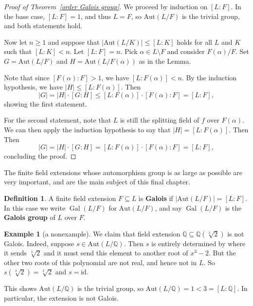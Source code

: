 \documentclass[12pt]{report}
\numberwithin{equation}{section}
\numberwithin{theorem}{chapter}
\theoremstyle{definition}
\newtheorem{definition}[theorem]{Definition}
\newtheorem{example}[theorem]{Example}
\newtheorem*{basic properties}{Basic Properties}
\newtheorem*{Important Remark}{Important Remark}
\newcommand{\df}[1]{{\bf #1}\index{#1}}
\DeclareMathOperator{\Gal}{Gal}
\begin{document}
\begin{proof}[Proof of Theorem~\ref{order Galois group}]
We proceed by induction on $[L : F]$. In the base case, $[L:F]=1$, and thus $L = F$, so $\mathrm{Aut}(L/F)$ is the trivial group, and both statements hold.

Now let $n \geqslant 1$ and suppose that $|\mathrm{Aut}(L/K)| \leqslant [L : K]$ holds for all $L$ and $K$ such that $[L : K] < n$. Let $[L : F] = n$. Pick $\alpha \in L \setminus F$ and consider $F(\alpha)/F$. Set $G=\mathrm{Aut}(L/F)$ and $H=\mathrm{Aut}(L/F(\alpha))$ as in the Lemma.


Note that since $[F(\alpha):F]>1$, we have $[L:F(\alpha)]<n$. 
By the induction hypothesis, we have $|H| \leqslant [L: F(\alpha)]$. Then 
\[ |G| = |H| \cdot [G:H] \leq [L:F(\alpha)] \cdot [F(\alpha) : F] =[L:F],\]
showing the first statement.

For the second statement, note that $L$ is still the splitting field of $f$ over $F(\alpha)$. We can then apply the induction hypothesis to say that $|H|=[L:F(\alpha)]$. Then 
Then 
\[ |G| = |H| \cdot [G:H] = [L:F(\alpha)] \cdot [F(\alpha) : F] =[L:F],\]
concluding the proof.
\end{proof}




The finite field extensions whose automorphism group is as large as possible are very important, and are the main subject of this final chapter.
 

\begin{definition}\index{$\Gal(L/F)$}
A {finite} field extension $F \subseteq L$ is {\bf Galois} if $|\mathrm{Aut}(L/F) |= [L:F]$. In this case we write $\Gal(L/F)$ for $\mathrm{Aut}(L/F)$, and say $\Gal(L/F)$ is the \df{Galois group} of $L$ over $F$.
\end{definition}



\begin{example}[a nonexample]\label{non Galois example}
We claim that field extension $\mathbb{Q} \subseteq \mathbb{Q}(\sqrt[3]{2})$ is not Galois. Indeed, suppose $s \in \mathrm{Aut}(L/\mathbb{Q})$. Then $s$ is entirely determined by where it sends $\sqrt[3]{2}$ and it must send this element to another root of $x^3 - 2$. But the other two roots of this polynomial are not real, and hence not in $L$. So $s(\sqrt[3]{2}) = \sqrt[3]{2}$ and $s = \mathrm{id}$.

This shows $\mathrm{Aut}(L/\mathbb{Q})$ is the trivial group, so $\mathrm{Aut}(L/\mathbb{Q}) = 1 < 3 = [L:\mathbb{Q}]$. In particular, the extension is not Galois.
\end{example}
\end{document}
